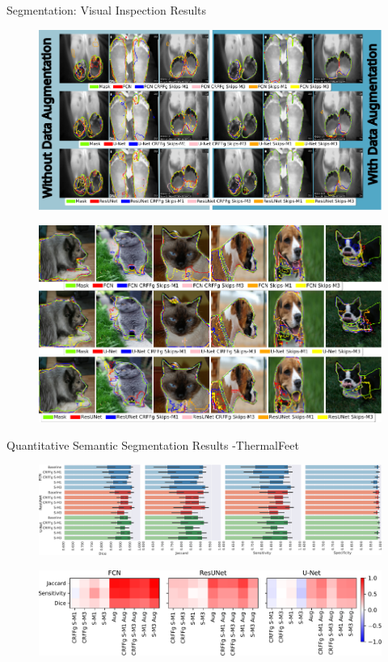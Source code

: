 \documentclass[aspectratio=169]{beamer}
\begin{document}
\begin{frame}[allowframebreaks]{Segmentation: Visual Inspection Results}

\begin{figure}
    \centering
    \includegraphics[width=0.8\linewidth]{Figures/visual_inspection.pdf}
\end{figure}
\framebreak
\begin{figure}
    \centering
    \includegraphics[width=0.74\linewidth]{Figures/oxfordResults.pdf}
\end{figure}

\end{frame}



\begin{frame}{Quantitative Semantic Segmentation Results -ThermalFeet}
    
    \begin{figure}
        \centering \includegraphics[width=1\linewidth]{Figures/results_infrared_thermal_feet.pdf}
    \end{figure}
    \begin{figure}
        \centering \includegraphics[width=0.695\linewidth]{Figures/baseline_models.pdf}
    \end{figure}
\end{frame}
\end{document}
